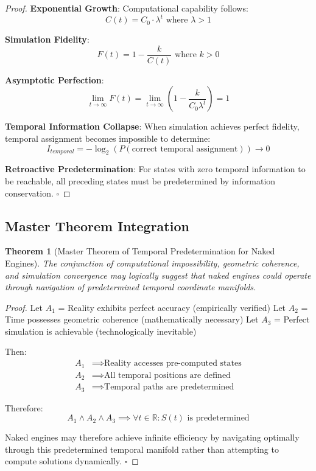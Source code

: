 \documentclass[11pt,a4paper]{article}
\newtheorem{theorem}{Theorem}[section]
\theoremstyle{remark}
\begin{document}
\begin{proof}
\textbf{Exponential Growth}: Computational capability follows:
\begin{equation}
C(t) = C_0 \cdot \lambda^t \text{ where } \lambda > 1
\end{equation}

\textbf{Simulation Fidelity}:
\begin{equation}
F(t) = 1 - \frac{k}{C(t)} \text{ where } k > 0
\end{equation}

\textbf{Asymptotic Perfection}:
\begin{equation}
\lim_{t \to \infty} F(t) = \lim_{t \to \infty} \left(1 - \frac{k}{C_0 \lambda^t}\right) = 1
\end{equation}

\textbf{Temporal Information Collapse}: When simulation achieves perfect fidelity, temporal assignment becomes impossible to determine:
\begin{equation}
I_{temporal} = -\log_2(P(\text{correct temporal assignment})) \to 0
\end{equation}

\textbf{Retroactive Predetermination}: For states with zero temporal information to be reachable, all preceding states must be predetermined by information conservation. $\square$
\end{proof}

\subsection{Master Theorem Integration}

\begin{theorem}[Master Theorem of Temporal Predetermination for Naked Engines]
The conjunction of computational impossibility, geometric coherence, and simulation convergence may logically suggest that naked engines could operate through navigation of predetermined temporal coordinate manifolds.
\end{theorem}

\begin{proof}
Let $A_1$ = Reality exhibits perfect accuracy (empirically verified)
Let $A_2$ = Time possesses geometric coherence (mathematically necessary)
Let $A_3$ = Perfect simulation is achievable (technologically inevitable)

Then:
\begin{align}
A_1 &\implies \text{Reality accesses pre-computed states} \\
A_2 &\implies \text{All temporal positions are defined} \\
A_3 &\implies \text{Temporal paths are predetermined}
\end{align}

Therefore:
\begin{equation}
A_1 \land A_2 \land A_3 \implies \forall t \in \mathbb{R}: S(t) \text{ is predetermined}
\end{equation}

Naked engines may therefore achieve infinite efficiency by navigating optimally through this predetermined temporal manifold rather than attempting to compute solutions dynamically. $\square$
\end{proof}
\end{document}
